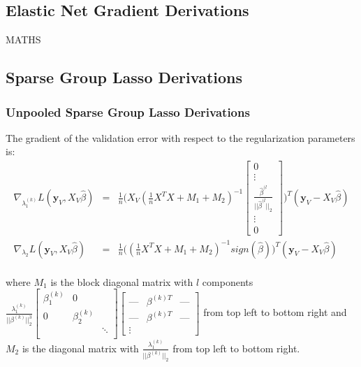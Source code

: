\documentclass[10pt,letterpaper]{article}
\begin{document}
\subsection{Elastic Net Gradient Derivations}
MATHS

\subsection{Sparse Group Lasso Derivations}

\subsubsection{Unpooled Sparse Group Lasso Derivations}
The gradient of the validation error with respect to the regularization parameters is:
\begin{equation}
\begin{array}{lcl}
\nabla_{\lambda_1^{(k)}} L(\boldsymbol y_V, X_V \hat \beta) &=& 
\frac{1}{n}
\Bigg (
X_V
(\frac{1}{n} X^T X + M_1 + M_2)^{-1}
\begin{bmatrix}
0 \\
\vdots \\
\frac{\hat\beta^{(l}}{||\hat\beta^{(l}||_2}\\
\vdots\\
0
\end{bmatrix}
\Bigg )^T
(\boldsymbol y_V - X_V \hat \beta)
 \\
\nabla_{\lambda_2} L(\boldsymbol y_V, X_V \hat \beta) &=&
\frac{1}{n}
\Bigg (
(\frac{1}{n} X^T X + M_1 + M_2)^{-1} sign(\hat \beta)
\Bigg )^T
(\boldsymbol y_V - X_V \hat \beta)
\\ 
\end{array}
\end{equation}

where $M_1$ is the block diagonal matrix with $l$ components 
$
\frac{\lambda_1^{(k)}}{|| \beta^{(k)}||_2^3}
\begin{bmatrix} 
\beta_1^{(k)} & 0 & \\
0 & \beta_2^{(k)} &  \\
 &  & \ddots \\
\end{bmatrix}
\begin{bmatrix}
\text{---} & \beta^{(k)T} & \text{---} \\
\text{---} & \beta^{(k)T} & \text{---} \\
\vdots
\end{bmatrix}
$ from top left to bottom right and $M_2$ is the diagonal matrix with $\frac{\lambda_1^{(k)}}{|| \beta^{(k)}||_2}$ from top left to bottom right.
\end{document}
